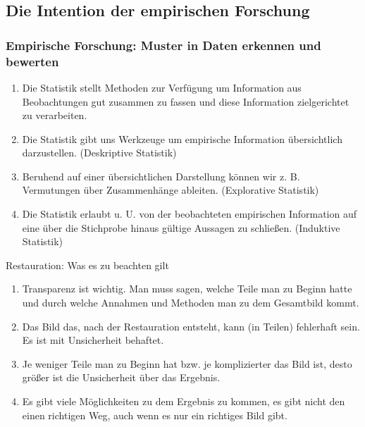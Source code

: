 \documentclass[usenames,dvipsnames,handout]{beamer}
\begin{document}
\subsection{Die Intention der empirischen Forschung}
\begin{frame}
 \frametitle{Empirische Forschung: Muster in Daten erkennen und bewerten}
 \begin{enumerate}
  \item {Die Statistik stellt Methoden zur Verfügung um Information aus Beobachtungen
  gut zusammen zu fassen und diese Information zielgerichtet zu verarbeiten.}
  \item {Die Statistik gibt uns Werkzeuge um empirische Information übersichtlich darzustellen.
  (Deskriptive Statistik)}
  \item {Beruhend auf einer übersichtlichen Darstellung können wir z. B. Vermutungen über Zusammenhänge
  ableiten. (Explorative Statistik)}
  \item {Die Statistik erlaubt u. U. von der beobachteten empirischen Information  auf eine über die Stichprobe hinaus gültige Aussagen zu schließen. (Induktive Statistik)}
 \end{enumerate}
\end{frame}



\begin{frame}{Restauration: Was es zu beachten gilt}
\begin{enumerate}
\item{Transparenz ist wichtig. Man muss sagen, welche Teile man zu Beginn hatte und durch welche 
Annahmen und Methoden man zu dem Gesamtbild kommt.}\pause
\item{Das Bild das, nach der Restauration entsteht, kann (in Teilen) fehlerhaft sein. Es ist mit Unsicherheit behaftet.}\pause
\item{Je weniger Teile man zu Beginn hat bzw. je komplizierter das Bild ist, desto größer ist die Unsicherheit über das Ergebnis.}\pause
\item{Es gibt  viele Möglichkeiten zu dem Ergebnis zu kommen, es gibt nicht den einen richtigen Weg,
auch wenn es nur ein richtiges Bild gibt.}\pause
\end{enumerate}
\end{frame}
\end{document}
